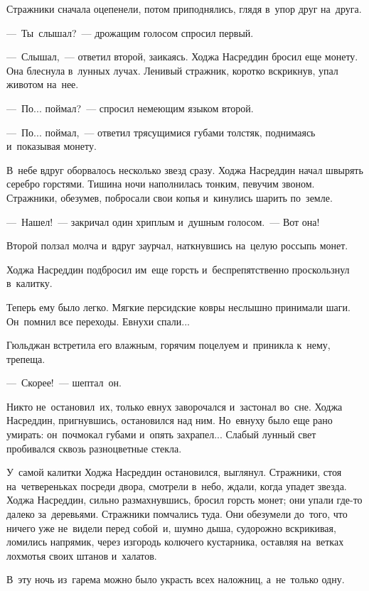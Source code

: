 \documentclass[12pt,a4paper]{book}
\begin{document}
Стражники сначала оцепенели, потом приподнялись, глядя в~упор друг на~друга.

—~Ты~слышал?~— дрожащим голосом спросил первый.

—~Слышал,~— ответил второй, заикаясь. Ходжа Насреддин бросил еще монету. Она блеснула в~лунных лучах. Ленивый стражник, коротко вскрикнув, упал животом на~нее.

—~По... поймал?~— спросил немеющим языком второй.

—~По... поймал,~— ответил трясущимися губами толстяк, поднимаясь и~показывая монету.

В~небе вдруг оборвалось несколько звезд сразу. Ходжа Насреддин начал швырять серебро горстями. Тишина ночи наполнилась тонким, певучим звоном. Стражники, обезумев, побросали свои копья и~кинулись шарить по~земле.

—~Нашел!~— закричал один хриплым и~душным голосом.~— Вот она!

Второй ползал молча и~вдруг заурчал, наткнувшись на~целую россыпь монет.

Ходжа Насреддин подбросил им~еще горсть и~беспрепятственно проскользнул в~калитку.

Теперь ему было легко. Мягкие персидские ковры неслышно принимали шаги. Он~помнил все переходы. Евнухи спали...

Гюльджан встретила его влажным, горячим поцелуем и~приникла к~нему, трепеща.

—~Скорее!~— шептал~он.

Никто не~остановил~их, только евнух заворочался и~застонал во~сне. Ходжа Насреддин, пригнувшись, остановился над ним. Но~евнуху было еще рано умирать: он~почмокал губами и~опять захрапел... Слабый лунный свет пробивался сквозь разноцветные стекла.

У~самой калитки Ходжа Насреддин остановился, выглянул. Стражники, стоя на~четвереньках посреди двора, смотрели в~небо, ждали, когда упадет звезда. Ходжа Насреддин, сильно размахнувшись, бросил горсть монет; они упали где-то далеко за~деревьями. Стражники помчались туда. Они обезумели до~того, что ничего уже не~видели перед собой~и, шумно дыша, судорожно вскрикивая, ломились напрямик, через изгородь колючего кустарника, оставляя на~ветках лохмотья своих штанов и~халатов.

В~эту ночь из~гарема можно было украсть всех наложниц, а~не~только одну.
\end{document}
